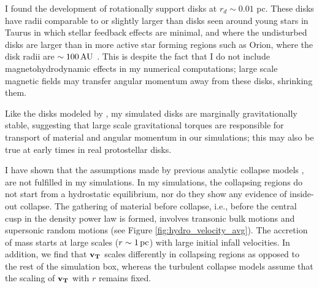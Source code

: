 \documentclass[../dissertation.tex]{subfiles}
\begin{document}
I found the development of rotationally support disks at $r_d \sim 0.01$ pc.  
These disks have radii comparable to or slightly larger than disks seen around 
young stars in Taurus \citep{1999AJ....117.1490P} in which stellar feedback effects are minimal,
and where the undisturbed disks are larger than in more active star forming regions such as Orion, 
where the disk radii are $\sim 100\,\rm AU$ \citep{2011ARA&A..49...67W}.  
This is despite the fact that I do not include magnetohydrodynamic effects 
in my numerical computations; large scale magnetic fields may transfer angular 
momentum away from these disks, shrinking them.  

Like the disks modeled by \citet{2010ApJ...708.1585K},
my simulated disks are marginally gravitationally stable, 
suggesting that large scale gravitational torques are 
responsible for transport of material and angular momentum in our simulations; this may
also be true at early times in real protostellar disks.  

I have shown that the assumptions made by previous analytic collapse models
\citep{1977ApJ...214..488S,1992ApJ...396..631M,1997ApJ...476..750M,2003ApJ...585..850M}, 
are not fulfilled in my simulations. 
In my simulations, the collapsing regions do not start from a hydrostatic equilibrium, nor 
do they show any evidence of inside-out collapse. 
The gathering of material before collapse, i.e.,
before the central cusp in the density power law is formed, involves transonic bulk motions 
and supersonic random motions (see Figure \ref{fig:hydro_velocity_avg}). 
The accretion of mass starts at large scales ($r\sim 1\,\rm pc$) with large initial infall velocities. 
In addition, we find that $\mathbf{v_T}$ 
scales differently in collapsing regions as opposed to the rest of the simulation box, 
whereas the turbulent collapse models \citep{1997ApJ...476..750M,2003ApJ...585..850M} assume 
that the scaling of $\mathbf{v_T}$ with $r$ remains fixed.  

\end{document}
